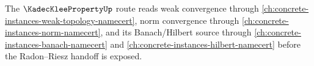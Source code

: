 \noindent The $\KadecKleePropertyUp$ route reads weak convergence through \autoref{ch:concrete-instances-weak-topology-namecert}, norm convergence through \autoref{ch:concrete-instances-norm-namecert}, and its Banach/Hilbert source through \autoref{ch:concrete-instances-banach-namecert} and \autoref{ch:concrete-instances-hilbert-namecert} before the Radon--Riesz handoff is exposed.


